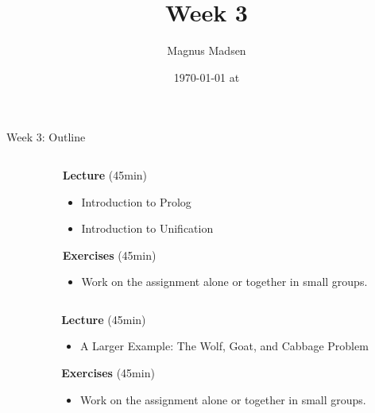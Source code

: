 

\title{Week 3}
\date{\today{} at \currenttime{}}
\author{Magnus Madsen}



\maketitle

\begin{frame}{Week 3: Outline}
\begin{columns}
\begin{column}{.05\textwidth}
\end{column}
\begin{column}{.95\textwidth}
    \footnotesize
\textbf{Lecture} (45min)  \vspace{-2mm}
\begin{itemize}
    \setlength\itemsep{-0.5em}
    \item Introduction to Prolog
    \item Introduction to Unification
\end{itemize}
\textbf{Exercises} (45min) \vspace{-2mm}
\begin{itemize}
    \item Work on the assignment alone or together in small groups.
\end{itemize}
\end{column}
\end{columns}

\medskip
\medskip
\medskip

\begin{columns}
\color{gray}
\begin{column}{.05\textwidth}
\end{column}
\begin{column}{.95\textwidth}
\footnotesize
\textbf{Lecture} (45min) \vspace{-2mm}
\begin{itemize}
    \color{gray}
    \setlength\itemsep{-0.5em}
    \item A Larger Example: The Wolf, Goat, and Cabbage Problem
\end{itemize}
\textbf{Exercises} (45min)  \vspace{-2mm}
\begin{itemize}
    \color{gray}
    \item Work on the assignment alone or together in small groups.
\end{itemize}
\end{column}
\end{columns}
\end{frame}

